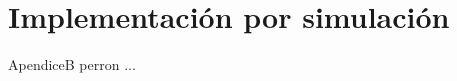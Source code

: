 \chapter{Implementación por simulación}\label{ApendiceB}\graphicspath{{06-Apendices/B/Figuras/}}
ApendiceB perron ...
